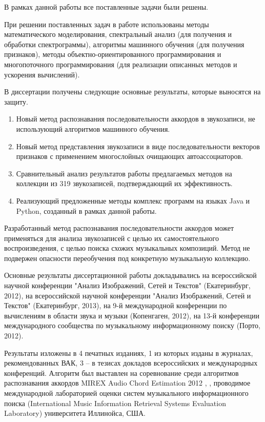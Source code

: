 В рамках данной работы все поставленные задачи были решены.

При решении поставленных задач в работе использованы методы математического
моделирования, спектральный анализ (для получения и обработки спектрограммы),
алгоритмы машинного обучения (для получения признаков), методы
объектно-ориентированного программирования и многопоточного программирования
(для реализации описанных методов и ускорения вычислений).

В диссертации получены следующие основные результаты, которые выносятся на
защиту.

\begin{enumerate}
  \item Новый метод распознавания последовательности аккордов в звукозаписи, не
  использующий алгоритмов машинного обучения.
  \item Новый метод представления звукозаписи в виде последовательности векторов
  признаков с применением многослойных очищающих автоассоциаторов.
  \item Сравнительный анализ результатов работы предлагаемых методов на
  коллекции из 319 звукозаписей, подтверждающий их эффективность.
  \item Реализующий предложенные методы комплекс программ на языках Java и
  Python, созданный в рамках данной работы.
\end{enumerate}

Разработанный метод распознавания последовательности аккордов может применяться
для анализа звукозаписей с целью их самостоятельного воспроизведения, с целью
поиска схожих музыкальных композиций. Метод не подвержен опасности переобучения
под конкретную музыкальную коллекцию.

Основные результаты диссертационной работы докладывались на всероссийской
научной конференции "Анализ Изображений, Сетей и Текстов" (Екатеринбург, 2012),
на всероссийской научной конференции "Анализ Изображений, Сетей и Текстов"
(Екатеринбург, 2013), на 9-й международной конференции по вычислениям в области
звука и музыки (Копенгаген, 2012), на 13-й конференции международного
сообщества по музыкальному информационному поиску (Порто, 2012).

Результаты изложены в 4 печатных изданиях, 1 из которых изданы в журналах,
рекомендованных ВАК, 3 -- в тезисах докладов всероссийских и международных
конференций. Алгоритм был выставлен на соревнование среди алгоритмов
распознавания аккордов MIREX Audio Chord Estimation 2012 \cite{ACEMrx},
\cite{ACEMcg}, проводимое международной лабораторией оценки систем музыкального
информационного поиска (International Music Information Retrieval Systems
Evaluation Laboratory) университета Иллинойса, США.

